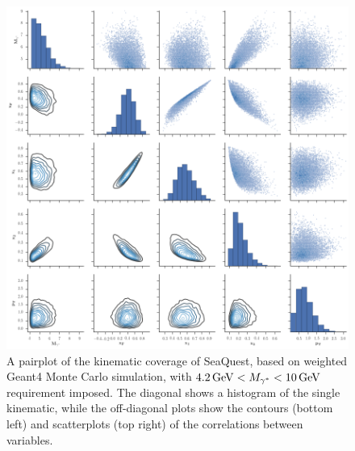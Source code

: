 \begin{figure}
	\centering
	\includegraphics[width=\textwidth]{figures/background/pairplot-kin.png}
	\caption{A pairplot of the kinematic coverage of SeaQuest, based on weighted Geant4 Monte Carlo simulation, with $\unit[4.2]{GeV} < M_{\gamma^*} < \unit[10]{GeV}$ requirement imposed. The diagonal shows a histogram of the single kinematic, while the off-diagonal plots show the contours (bottom left) and scatterplots (top right) of the correlations between variables.}
	\label{fig:pairplot-kin}
\end{figure}
